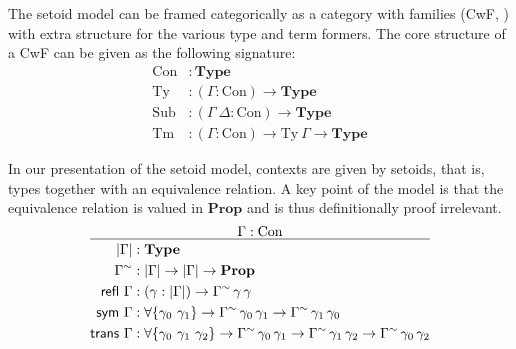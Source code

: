 \documentclass[autoref]{llncs}
\newcommand{\GG}{\Gamma}
\newcommand{\GD}{\Delta}
\newcommand{\mType}{\mathbf{Type}}
\newcommand{\mProp}{\mathbf{Prop}}
\newcommand{\Con}{\mathrm{Con}}
\newcommand{\Ty}{\mathrm{Ty}}
\newcommand{\Tm}{\mathrm{Tm}}
\newcommand{\Sub}{\mathrm{Sub}}
\begin{document}
The setoid model can be framed categorically as a category with families (CwF,
\cite{internal-tt}) with extra structure for the various type and term
formers. The core structure of a CwF can be given as the following signature:
{\small\vspace{-0.2em}
\begin{align*}
  \Con &: \mType \\
  \Ty &: (\GG : \Con) \to \mType \\
  \Sub &: (\GG\ \GD : \Con) \to \mType \\
  \Tm &: (\GG : \Con) \to \Ty\ \GG \to \mType
\end{align*}}\vspace{-1em}

In our presentation of the setoid model, contexts are given by setoids, that is,
types together with an equivalence relation. A key point of the model is that the
equivalence relation is valued in $\mProp$ and is thus definitionally proof
irrelevant.
{\small\[
\infer{
  \begin{aligned}
    | \GG | &: \mType \\
    \GG^\sim &: | \GG | \to | \GG | \to \mProp \\
    \textsf{refl}\ \GG &: (\gamma : | \GG |) \to \GG^\sim\,\gamma\,\gamma \\
    \textsf{sym} \ \GG &: \forall\{\gamma_0\ \gamma_1\} \to \GG^\sim\,\gamma_0\,\gamma_1
    \to \GG^\sim\,\gamma_1\,\gamma_0 \\
    \textsf{trans} \ \GG &: \forall\{\gamma_0\ \gamma_1\ \gamma_2\}
    \to \GG^\sim\,\gamma_0\,\gamma_1
    \to \GG^\sim\,\gamma_1\,\gamma_2
    \to \GG^\sim\,\gamma_0\,\gamma_2
  \end{aligned}
}{
  \GG : \Con
}
\]}\vspace{-1em}
\end{document}
